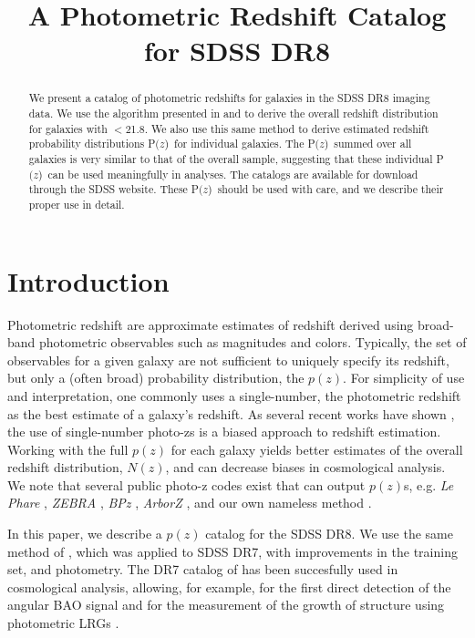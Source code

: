 \documentclass{emulateapj}
\newcommand{\rmax}{21.8}
\newcommand{\pofz}{P$(z$)}
\begin{document}
\title{A Photometric Redshift Catalog for SDSS DR8}



\begin{abstract}

We present a catalog of photometric redshifts for galaxies in the SDSS DR8
imaging data.  We use the algorithm presented in \citet{LimaPhotoz08} and
\citet{CunhaPhotoz09} to derive the overall redshift distribution for galaxies
with \rmag$ < $\rmax.  We also use this same method to derive estimated
redshift probability distributions \pofz\ for individual galaxies.  The \pofz\
summed over all galaxies is very similar to that of the overall sample,
suggesting that these individual \pofz\ can be used meaningfully in analyses.
The catalogs are available for download through the SDSS website.  These \pofz\
should be used with care, and we describe their proper use in detail.

\end{abstract}

\section{Introduction} \label{sec:method}

Photometric redshift are approximate estimates of redshift derived using broad-band photometric 
observables such as magnitudes and colors.
Typically, the set of observables for a given galaxy are not sufficient to uniquely specify its
redshift, but only a (often broad) probability distribution, the $p(z)$. 
For simplicity of use and interpretation, one commonly uses a single-number, the photometric redshift
as the best estimate of a galaxy's redshift.
As several recent works have shown \citep{man08,CunhaPhotoz09,wit09,bor10,abr11}, the use of single-number 
photo-zs is a biased approach to redshift estimation. 
Working with the full $p(z)$ for each galaxy yields better estimates of the overall redshift distribution, $N(z)$,
and can decrease biases in cosmological analysis.
We note that several public photo-z codes exist that can output $p(z)$s, e.g. 
{\it Le Phare} \citep{...}, {\it ZEBRA} \citep{}, {\it BPz} \citep{}, {\it ArborZ} 
\citep{...}, and our own nameless method \citep{CunhaPhotoz09}.


In this paper, we describe a $p(z)$ catalog for the SDSS DR8. 
We use the same method of \citep{CunhaPhotoz09}, which was applied to SDSS DR7, 
with improvements in the training set, and  photometry. 
The DR7 catalog of \cite{CunhaPhotoz09} has been succesfully used in cosmological analysis, allowing, for example, 
for the first direct detection of the angular BAO signal \citep{car11} and for the measurement of the 
growth of structure using photometric LRGs \citep{cro11}. %
\end{document}

